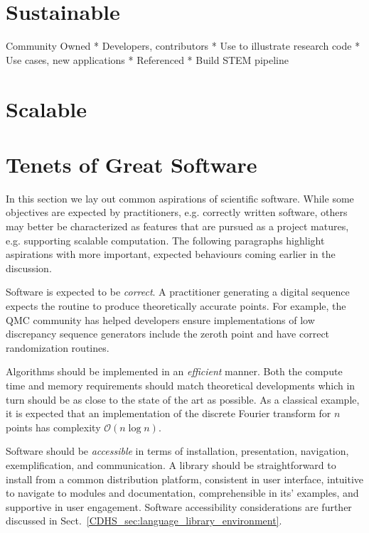 \documentclass[graybox]{svmult}
\begin{document}
\section{Sustainable} \label{CDHS_sec:sustainable} Community Owned
* Developers, contributors
* Use to illustrate research code
* Use cases, new applications
* Referenced
* Build STEM pipeline

\section{Scalable} \label{CDHS_sec:scalable}


\section{Tenets of Great Software} \label{CDHS_sec:tenets_of_great_software}

In this section we lay out common aspirations of scientific software. While some objectives are expected by practitioners, e.g. correctly written software, others may better be characterized as features that are pursued as a project matures, e.g. supporting scalable computation. The following paragraphs highlight aspirations with more important, expected behaviours coming earlier in the discussion.

Software is expected to be \emph{correct}. A practitioner generating a digital sequence expects the routine to produce theoretically accurate points. For example, the QMC community has helped developers ensure implementations of low discrepancy sequence generators include the zeroth point \cite{Owe22a, scipySobol2020a} and  have correct randomization routines. %

Algorithms should be implemented in an \emph{efficient} manner. Both the compute time and memory requirements should match theoretical developments which in turn should be as close to the state of the art as possible. As a classical example, it is expected that an implementation of the discrete Fourier transform for $n$ points has complexity $\mathcal{O}(n\log n)$.

Software should be \emph{accessible} in terms of installation, presentation, navigation, exemplification, and communication. A library should be straightforward to install from a common distribution platform, consistent in user interface, intuitive to navigate to modules and documentation, comprehensible in its' examples, and supportive in user engagement. Software accessibility considerations are further discussed in Sect.\ \ref{CDHS_sec:language_library_environment}.
\end{document}
